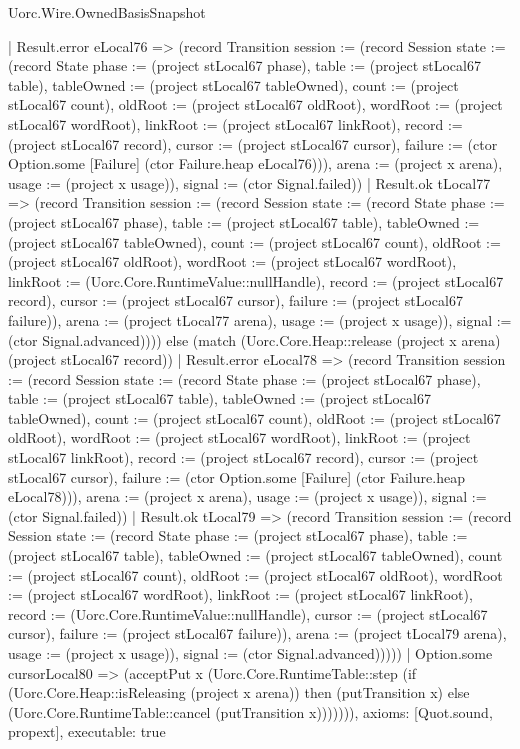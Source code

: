 \begin{lexlean}{Uorc.Wire.OwnedBasisSnapshot}
\begin{semanticmodule}
{      | Result.error eLocal76 => (record Transition {session := (record Session {state := (record State {phase := (project stLocal67 phase), table := (project stLocal67 table), tableOwned := (project stLocal67 tableOwned), count := (project stLocal67 count), oldRoot := (project stLocal67 oldRoot), wordRoot := (project stLocal67 wordRoot), linkRoot := (project stLocal67 linkRoot), record := (project stLocal67 record), cursor := (project stLocal67 cursor), failure := (ctor Option.some [Failure] (ctor Failure.heap eLocal76))}), arena := (project x arena), usage := (project x usage)}), signal := (ctor Signal.failed)})
      | Result.ok tLocal77 => (record Transition {session := (record Session {state := (record State {phase := (project stLocal67 phase), table := (project stLocal67 table), tableOwned := (project stLocal67 tableOwned), count := (project stLocal67 count), oldRoot := (project stLocal67 oldRoot), wordRoot := (project stLocal67 wordRoot), linkRoot := (Uorc.Core.RuntimeValue::nullHandle), record := (project stLocal67 record), cursor := (project stLocal67 cursor), failure := (project stLocal67 failure)}), arena := (project tLocal77 arena), usage := (project x usage)}), signal := (ctor Signal.advanced)}))) else (match (Uorc.Core.Heap::release (project x arena) (project stLocal67 record))
      | Result.error eLocal78 => (record Transition {session := (record Session {state := (record State {phase := (project stLocal67 phase), table := (project stLocal67 table), tableOwned := (project stLocal67 tableOwned), count := (project stLocal67 count), oldRoot := (project stLocal67 oldRoot), wordRoot := (project stLocal67 wordRoot), linkRoot := (project stLocal67 linkRoot), record := (project stLocal67 record), cursor := (project stLocal67 cursor), failure := (ctor Option.some [Failure] (ctor Failure.heap eLocal78))}), arena := (project x arena), usage := (project x usage)}), signal := (ctor Signal.failed)})
      | Result.ok tLocal79 => (record Transition {session := (record Session {state := (record State {phase := (project stLocal67 phase), table := (project stLocal67 table), tableOwned := (project stLocal67 tableOwned), count := (project stLocal67 count), oldRoot := (project stLocal67 oldRoot), wordRoot := (project stLocal67 wordRoot), linkRoot := (project stLocal67 linkRoot), record := (Uorc.Core.RuntimeValue::nullHandle), cursor := (project stLocal67 cursor), failure := (project stLocal67 failure)}), arena := (project tLocal79 arena), usage := (project x usage)}), signal := (ctor Signal.advanced)}))))
    | Option.some cursorLocal80 => (acceptPut x (Uorc.Core.RuntimeTable::step (if (Uorc.Core.Heap::isReleasing (project x arena)) then (putTransition x) else (Uorc.Core.RuntimeTable::cancel (putTransition x))))))),
  axioms: [Quot.sound, propext],
  executable: true
}


\end{semanticmodule}
\end{lexlean}
